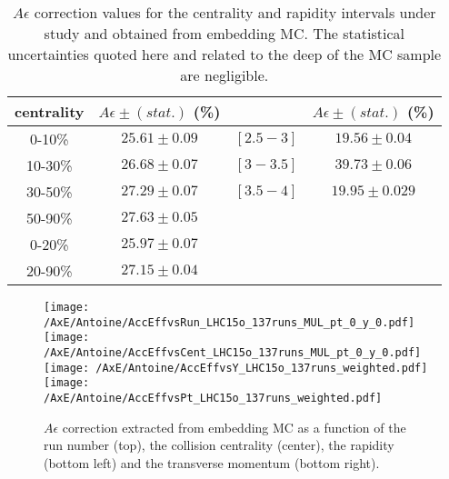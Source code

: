 \begin{table}[htb]
  \centering
  \begin{tabular} { c | c | c | c}
    \hline
    centrality & $A\epsilon \pm (stat.)$ (\%) &  \y & $A\epsilon \pm (stat.)$ (\%)\\\hline
    0-10\% &  $ 25.61 \pm 0.09 $   &  $[2.5-3]$ & $19.56 \pm 0.04$ \\
    10-30\% & $ 26.68 \pm 0.07 $  & $[3-3.5]$ & $ 39.73 \pm  0.06 $ \\
    30-50\% & $ 27.29 \pm 0.07 $ & $[3.5-4]$ & $ 19.95 \pm  0.029 $ \\
    50-90\% & $ 27.63 \pm 0.05 $  &  \\
    0-20\% & $ 25.97 \pm 0.07 $   &  & \\
    20-90\% & $ 27.15 \pm 0.04 $   &  & \\\hline
  \end{tabular}
  \caption{\label{AccEffValues}\ups $A\epsilon$ correction values for the centrality and rapidity intervals under study and obtained from embedding MC. The statistical uncertainties quoted here and related to the deep of the MC sample are negligible.} 
\end{table}

\begin{figure}[!t]
\begin{center}
\texttt{[image: /AxE/Antoine/AccEffvsRun\_LHC15o\_137runs\_MUL\_pt\_0\_y\_0.pdf]}
\texttt{[image: /AxE/Antoine/AccEffvsCent\_LHC15o\_137runs\_MUL\_pt\_0\_y\_0.pdf]}\\
\texttt{[image: /AxE/Antoine/AccEffvsY\_LHC15o\_137runs\_weighted.pdf]}
\texttt{[image: /AxE/Antoine/AccEffvsPt\_LHC15o\_137runs\_weighted.pdf]}
\end{center}
\caption{\label{AccEffplots}$A\epsilon$ correction extracted from embedding MC as a function of the run number (top), the collision centrality (center), the \ups rapidity (bottom left) and the \ups transverse momentum (bottom right).}
\end{figure}
